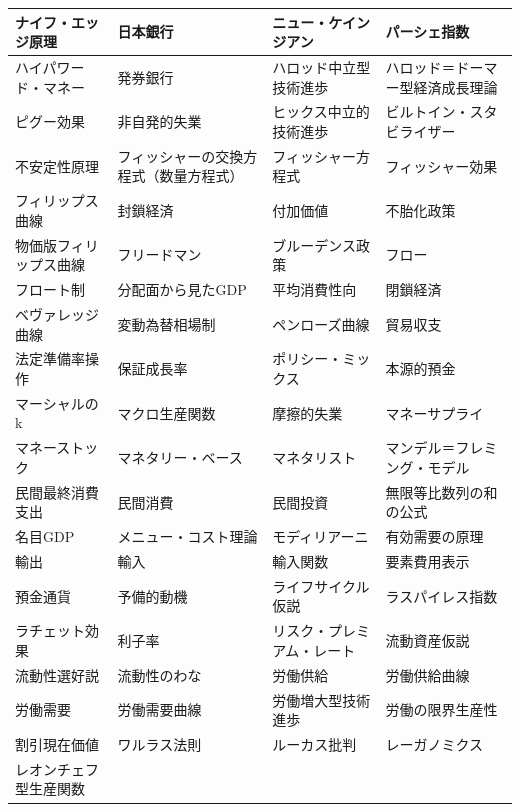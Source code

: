 \documentclass[xelatex,a4paper,base=11pt,ja=standard,jafont=noto]{bxjsreport}
\begin{document}
\begin{table}[H]
\begin{tabular}{|>{\raggedright\arraybackslash}p{3.5cm}|>{\raggedright\arraybackslash}p{3.5cm}|>{\raggedright\arraybackslash}p{3.5cm}|>{\raggedright\arraybackslash}p{3.5cm}|}
\hline
ナイフ・エッジ原理 & 日本銀行 & ニュー・ケインジアン & パーシェ指数 \\
\hline
ハイパワード・マネー & 発券銀行 & ハロッド中立型技術進歩 & ハロッド＝ドーマー型経済成長理論 \\
\hline
ピグー効果 & 非自発的失業 & ヒックス中立的技術進歩 & ビルトイン・スタビライザー \\
\hline
不安定性原理 & フィッシャーの交換方程式（数量方程式） & フィッシャー方程式 & フィッシャー効果 \\
\hline
フィリップス曲線 & 封鎖経済 & 付加価値 & 不胎化政策 \\
\hline
物価版フィリップス曲線 & フリードマン & ブルーデンス政策 & フロー \\
\hline
フロート制 & 分配面から見たGDP & 平均消費性向 & 閉鎖経済 \\
\hline
ベヴァレッジ曲線 & 変動為替相場制 & ペンローズ曲線 & 貿易収支 \\
\hline
法定準備率操作 & 保証成長率 & ポリシー・ミックス & 本源的預金 \\
\hline
マーシャルのk & マクロ生産関数 & 摩擦的失業 & マネーサプライ \\
\hline
マネーストック & マネタリー・ベース & マネタリスト & マンデル＝フレミング・モデル \\
\hline
民間最終消費支出 & 民間消費 & 民間投資 & 無限等比数列の和の公式 \\
\hline
名目GDP & メニュー・コスト理論 & モディリアーニ & 有効需要の原理 \\
\hline
輸出 & 輸入 & 輸入関数 & 要素費用表示 \\
\hline
預金通貨 & 予備的動機 & ライフサイクル仮説 & ラスパイレス指数 \\
\hline
ラチェット効果 & 利子率 & リスク・プレミアム・レート & 流動資産仮説 \\
\hline
流動性選好説 & 流動性のわな & 労働供給 & 労働供給曲線 \\
\hline
労働需要 & 労働需要曲線 & 労働増大型技術進歩 & 労働の限界生産性 \\
\hline
割引現在価値 & ワルラス法則 & ルーカス批判 & レーガノミクス \\
\hline
レオンチェフ型生産関数 & & & \\
\hline
\end{tabular}
\end{table}

\newpage
\end{document}
